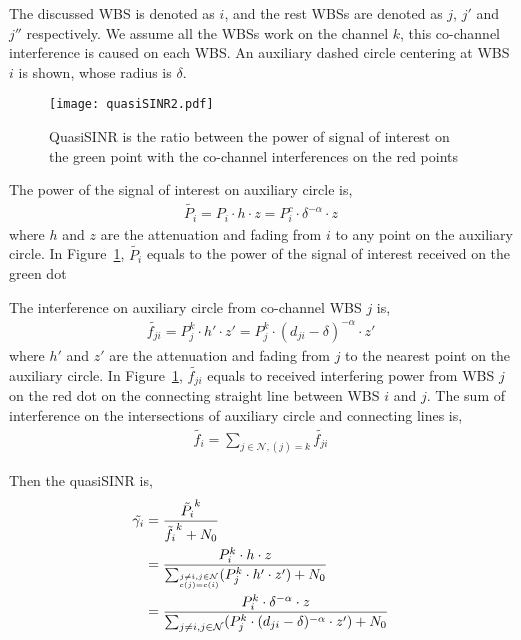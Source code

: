 The discussed WBS is denoted as $i$, and the rest WBSs are denoted as $j$, $j'$ and $j''$ respectively.
We assume all the WBSs work on the channel $k$, this co-channel interference is caused on each WBS.
An auxiliary dashed circle centering at WBS $i$ is shown, whose radius is $\delta$. 


\begin{figure}[h!]
  \centering
  \texttt{[image: quasiSINR2.pdf]}
  \caption{QuasiSINR is the ratio between the power of signal of interest on the green point with the co-channel interferences on the red points}
\label{quasiSINRfigure}
\end{figure}


The power of the signal of interest on auxiliary circle is,
\begin{equation}
\label{quasiSINR_1}
\begin{aligned}
\tilde{P_i} = P_i\cdot h\cdot z = P_i^c\cdot \delta^{-\alpha}\cdot z
\end{aligned}
\end{equation}	
where $h$ and $z$ are the attenuation and fading from $i$ to any point on the auxiliary circle.
In Figure~\ref{quasiSINRfigure}, $\tilde{P_i}$ equals to the power of the signal of interest received on the green dot 

The interference on auxiliary circle from co-channel WBS $j$ is,
\begin{equation}
\label{quasiSINR_inf}
\begin{aligned}
\tilde{f_{ji}} = P_j^k\cdot h'\cdot z' = P_j^k\cdot (d_{ji}-\delta)^{-\alpha}\cdot z'
\end{aligned}
\end{equation}
where $h'$ and $z'$ are the attenuation and fading from $j$ to the nearest point on the auxiliary circle.
In Figure~\ref{quasiSINRfigure}, $\tilde{f_{ji}}$ equals to received interfering power from WBS $j$ on the red dot on the connecting straight line between WBS $i$ and $j$.
The sum of interference on the intersections of auxiliary circle and connecting lines is, 
\begin{equation}
\label{quasiSINR_infs}
\begin{aligned}
\tilde{f_{i}} = \sum_{j\in\mathcal{N}, (j)=k} \tilde{f_{ji}}
\end{aligned}
\end{equation}	

Then the quasiSINR is, 
\begin{equation}
\label{quasiSINR}
\begin{aligned}
 \tilde{\gamma_{i}} & = \frac{\tilde{P_i}^k}{\tilde{f_i}^k + N_0} \\
&=\frac{P_{i}^k \cdot h \cdot z} {\sum_{\tiny\substack{j\neq i, j\in \mathcal{N}\\c(j)=c(i)}} (P_j^k \cdot h' \cdot z') + N_0}\\
&= \frac{P_{i}^k \cdot \delta^{-\alpha}\cdot z} {\sum_{j\neq i, j\in \mathcal{N}} (P_j^k \cdot (d_{ji}-\delta)^{-\alpha} \cdot z') + N_0}
\end{aligned}
\end{equation}

